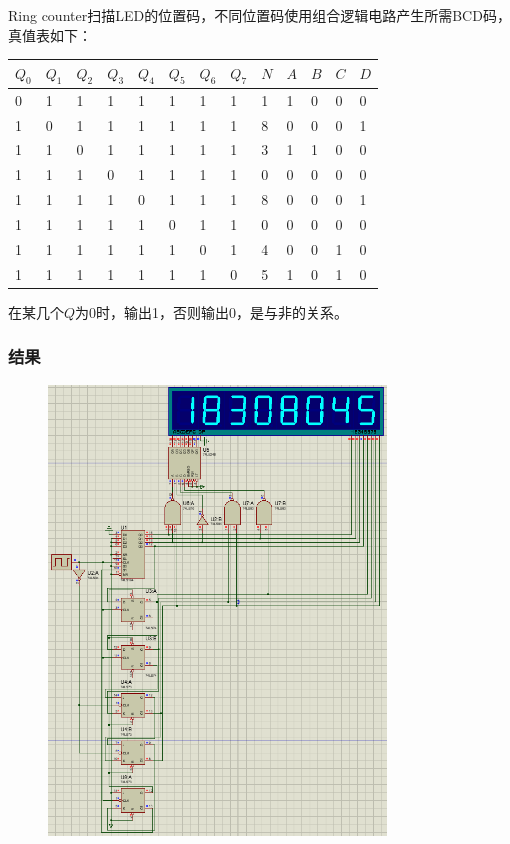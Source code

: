 \documentclass[UTF8, a4paper, 11pt]{article}
\begin{document}
Ring counter扫描LED的位置码，不同位置码使用组合逻辑电路产生所需BCD码，真值表如下：
\begin{table}[H]
    \center
\begin{tabular}{|l|l|l|l|l|l|l|l|l|l|l|l|l|}
\hline
$Q_0$ & $Q_1$ & $Q_2$ & $Q_3$ & $Q_4$ & $Q_5$ & $Q_6$ & $Q_7$ & $N$ & $A$ & $B$ & $C$ & $D$ \\ \hline
0  & 1  & 1  & 1  & 1  & 1  & 1  & 1  & 1 & 1 & 0 & 0 & 0 \\ \hline
1  & 0  & 1  & 1  & 1  & 1  & 1  & 1  & 8 & 0 & 0 & 0 & 1 \\ \hline
1  & 1  & 0  & 1  & 1  & 1  & 1  & 1  & 3 & 1 & 1 & 0 & 0 \\ \hline
1  & 1  & 1  & 0  & 1  & 1  & 1  & 1  & 0 & 0 & 0 & 0 & 0 \\ \hline
1  & 1  & 1  & 1  & 0  & 1  & 1  & 1  & 8 & 0 & 0 & 0 & 1 \\ \hline
1  & 1  & 1  & 1  & 1  & 0  & 1  & 1  & 0 & 0 & 0 & 0 & 0 \\ \hline
1  & 1  & 1  & 1  & 1  & 1  & 0  & 1  & 4 & 0 & 0 & 1 & 0 \\ \hline
1  & 1  & 1  & 1  & 1  & 1  & 1  & 0  & 5 & 1 & 0 & 1 & 0 \\ \hline
\end{tabular}
\end{table}
在某几个$Q$为0时，输出1，否则输出0，是与非的关系。
\subsubsection{结果}
\begin{figure}[H]
    \centering
    \includegraphics[width=0.8\textwidth]{ex11.1结果.png}
\end{figure}
\end{document}
